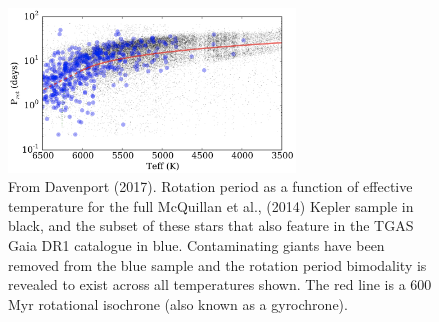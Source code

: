 \documentclass[useAMS, usenatbib, preprint, 12pt]{aastex}
\begin{document}
\begin{figure}
\begin{center}
\includegraphics[width=3in, clip=true]{Davenport.png}
\caption{From Davenport (2017).
    Rotation period as a function of effective
temperature for the full McQuillan et al., (2014) Kepler sample in black, and
the subset of these stars that also feature in the TGAS Gaia DR1 catalogue in
blue. Contaminating giants have been removed from the blue sample and the
rotation period bimodality is revealed to exist across all temperatures shown.
    The red line is a 600 Myr rotational isochrone (also known as a gyrochrone).}
\label{fig:davenport}
\end{center}
\end{figure}


\end{document}
